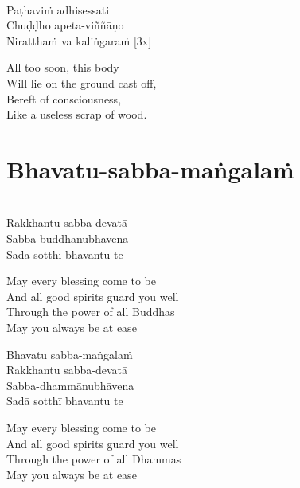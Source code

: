 \begin{pali-hang}
\\
Paṭhaviṁ adhisessati\\
Chuḍḍho apeta-viññāṇo\\
Niratthaṁ va kaliṅgaraṁ \hfill{[3x]}
\end{pali-hang}

\begin{english-verses}
  All too soon, this body\\
  Will lie on the ground cast off,\\
  Bereft of consciousness,\\
  Like a useless scrap of wood.
\end{english-verses}

\suttaRef{[Dhp 41]}

\section{Bhavatu-sabba-maṅgalaṁ}
\label{bhavatu}

\vspace{-0.8em}

\begin{pali-hang}
\\
Rakkhantu sabba-devatā\\
Sabba-buddhānubhāvena\\
Sadā sotthī bhavantu te
\end{pali-hang}

\begin{english-verses}
  May every blessing come to be\\
  And all good spirits guard you well\\
  Through the power of all Buddhas\\
  May you always be at ease
\end{english-verses}

\begin{pali-hang-continued}
Bhavatu sabba-maṅgalaṁ\\
Rakkhantu sabba-devatā\\
Sabba-dhammānubhāvena\\
Sadā sotthī bhavantu te
\end{pali-hang-continued}

\begin{english-verses}
  May every blessing come to be\\
  And all good spirits guard you well\\
  Through the power of all Dhammas\\
  May you always be at ease
\end{english-verses}

